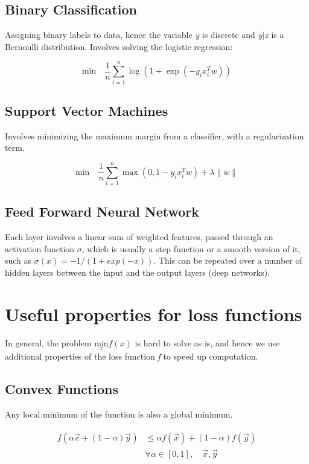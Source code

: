 \documentclass[12pt]{report}
\begin{document}
\subsection{Binary Classification}
Assigning binary labels to data, hence the variable \textit{y} is discrete and \textit{y}$|$\textit{x} is a Bernoulli distribution. Involves solving the logistic regression:

\begin{equation}
\text{min} \quad \frac{1}{n} \sum_{i=1}^n \log ( 1 + \exp(-y_ix_i^Tw))
\end{equation}

\subsection{Support Vector Machines}
Involves minimizing the maximum margin from a classifier, with a regularization term.

\begin{equation}
\text{min} \quad \frac{1}{n} \sum_{i=1}^n \max(0,1 - y_i x_i^T w) + \lambda \|w\|
\end{equation}

\subsection{Feed Forward Neural Network}
Each layer involves a linear sum of weighted features, passed through an activation function $ \sigma $, which is usually a step function or a smooth version of it, such as $ \sigma (x) = -1/(1+exp(-x))$. This can be repeated over a number of hidden layers between the input and the output layers (deep networks).  

\section{Useful properties for loss functions}
In general, the problem $\underset{x}{\text{min}} f(x)$ is hard to solve as is, and hence we use additional properties of the loss function \textit{f} to speed up computation.
\subsection{Convex Functions}

Any local minimum of the function is also a global minimum.

\begin{align}
\begin{aligned}
f( \alpha \vec{x} + (1-\alpha) \vec{y} ) & \le \alpha f(\vec{x}) + (1-\alpha) f(\vec{y}) \\
& \forall \alpha \in [0,1], \quad \vec{x}, \vec{y}
\end{aligned}
\end{align}
\end{document}
